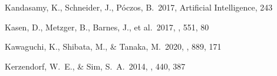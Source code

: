 \documentclass[twocolumn, twocolappendix]{aastex63}
\begin{document}
\begin{itemize}
\begin{thebibliography}{}






 Kandasamy, K., Schneider, J., P{\'o}czos, B.\ 2017, Artificial Intelligence, 243








 Kasen, D., Metzger, B., Barnes, J., et al.\ 2017, \nat, 551, 80












 Kawaguchi, K., Shibata, M., \& Tanaka, M.\ 2020, \apj, 889, 171


 Kerzendorf, W.~E., \& Sim, S.~A.\ 2014, \mnras, 440, 387







\end{thebibliography}
\end{itemize}
\end{document}
